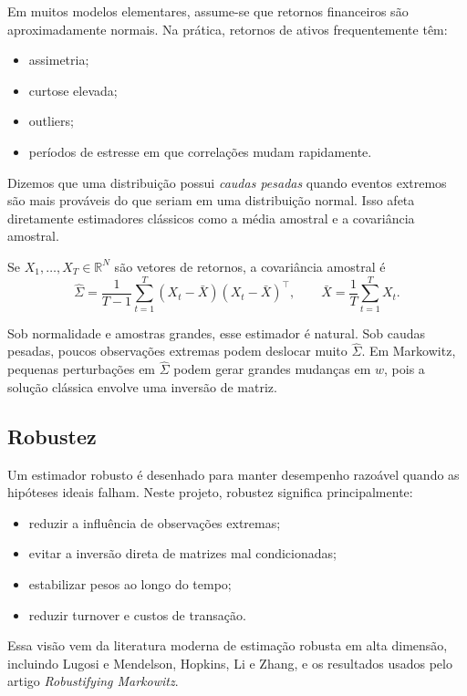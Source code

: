 \documentclass[12pt,a4paper]{article}
\newcommand{\R}{\mathbb{R}}
\newcommand{\Sigmahat}{\widehat{\Sigma}}
\begin{document}
Em muitos modelos elementares, assume-se que retornos financeiros são aproximadamente
normais. Na prática, retornos de ativos frequentemente têm:

\begin{itemize}[leftmargin=*]
  \item assimetria;
  \item curtose elevada;
  \item outliers;
  \item períodos de estresse em que correlações mudam rapidamente.
\end{itemize}

Dizemos que uma distribuição possui \emph{caudas pesadas} quando eventos extremos são mais
prováveis do que seriam em uma distribuição normal. Isso afeta diretamente estimadores
clássicos como a média amostral e a covariância amostral.

Se $X_1,\dots,X_T \in \R^N$ são vetores de retornos, a covariância amostral é
\begin{equation}
  \Sigmahat
  =
  \frac{1}{T-1}\sum_{t=1}^{T}(X_t-\bar X)(X_t-\bar X)^\top,
  \qquad
  \bar X = \frac{1}{T}\sum_{t=1}^{T} X_t.
\end{equation}

Sob normalidade e amostras grandes, esse estimador é natural. Sob caudas pesadas, poucos
observações extremas podem deslocar muito $\Sigmahat$. Em Markowitz, pequenas perturbações
em $\Sigmahat$ podem gerar grandes mudanças em $w$, pois a solução clássica envolve uma
inversão de matriz.

\subsection{Robustez}

Um estimador robusto é desenhado para manter desempenho razoável quando as hipóteses
ideais falham. Neste projeto, robustez significa principalmente:

\begin{itemize}[leftmargin=*]
  \item reduzir a influência de observações extremas;
  \item evitar a inversão direta de matrizes mal condicionadas;
  \item estabilizar pesos ao longo do tempo;
  \item reduzir turnover e custos de transação.
\end{itemize}

Essa visão vem da literatura moderna de estimação robusta em alta dimensão, incluindo
Lugosi e Mendelson, Hopkins, Li e Zhang, e os resultados usados pelo artigo
\emph{Robustifying Markowitz}.
\end{document}
